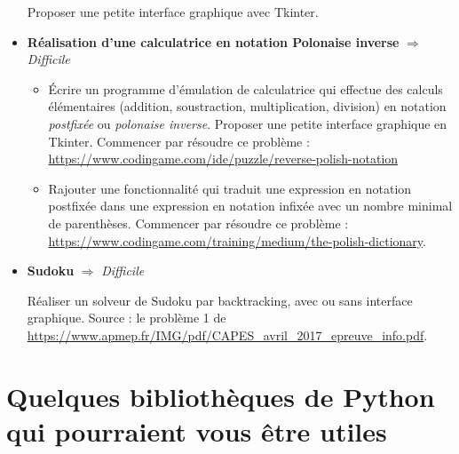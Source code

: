 \documentclass[a4paper, french, 12pt]{article}  %
\newcounter{act}
\begin{document}
\begin{itemize}
Proposer une petite interface graphique avec Tkinter.

\bigskip

\item \textbf{Réalisation d'une calculatrice en notation Polonaise inverse} $\Rightarrow$ \textit{Difficile}

\medskip

\begin{itemize}

 \item Écrire un programme d'émulation de calculatrice qui effectue des calculs  élémentaires (addition, soustraction, multiplication, division) en notation \textit{postfixée} ou \textit{ polonaise inverse}. Proposer une petite interface graphique en Tkinter. Commencer par résoudre ce problème : \url{https://www.codingame.com/ide/puzzle/reverse-polish-notation}
 
 \item Rajouter une fonctionnalité qui traduit une expression en notation postfixée dans une  expression en notation infixée avec  un nombre minimal de parenthèses. Commencer par résoudre ce problème : \url{https://www.codingame.com/training/medium/the-polish-dictionary}.
 
 \end{itemize}

 \bigskip
 
 
\item \textbf{Sudoku} $\Rightarrow$ \textit{Difficile}
 
\medskip

Réaliser un solveur de Sudoku  par backtracking, avec ou sans interface graphique.  Source : le problème 1 de \url{https://www.apmep.fr/IMG/pdf/CAPES_avril_2017_epreuve_info.pdf}. 



\end{itemize}

\section{Quelques bibliothèques de Python qui pourraient vous \^etre utiles}
\end{document}
